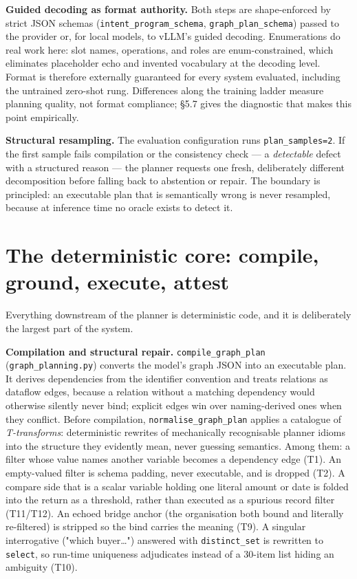 \textbf{Guided decoding as format authority.} Both steps are shape-enforced by strict JSON schemas (\texttt{intent\_program\_schema}, \texttt{graph\_plan\_schema}) passed to the provider or, for local models, to vLLM's guided decoding. Enumerations do real work here: slot names, operations, and roles are enum-constrained, which eliminates placeholder echo and invented vocabulary at the decoding level. Format is therefore externally guaranteed for every system evaluated, including the untrained zero-shot rung. Differences along the training ladder measure planning quality, not format compliance; §5.7 gives the diagnostic that makes this point empirically.

\textbf{Structural resampling.} The evaluation configuration runs \texttt{plan\_samples=2}. If the first sample fails compilation or the consistency check --- a \emph{detectable} defect with a structured reason --- the planner requests one fresh, deliberately different decomposition before falling back to abstention or repair. The boundary is principled: an executable plan that is semantically wrong is never resampled, because at inference time no oracle exists to detect it.

\section{The deterministic core: compile, ground, execute, attest}\label{sec:the-deterministic-core-compile-ground-ex}

Everything downstream of the planner is deterministic code, and it is deliberately the largest part of the system.

\textbf{Compilation and structural repair.} \texttt{compile\_graph\_plan} (\texttt{graph\_planning.py}) converts the model's graph JSON into an executable plan. It derives dependencies from the identifier convention and treats relations as dataflow edges, because a relation without a matching dependency would otherwise silently never bind; explicit edges win over naming-derived ones when they conflict. Before compilation, \texttt{normalise\_graph\_plan} applies a catalogue of \emph{T-transforms}: deterministic rewrites of mechanically recognisable planner idioms into the structure they evidently mean, never guessing semantics. Among them: a filter whose value names another variable becomes a dependency edge (T1). An empty-valued filter is schema padding, never executable, and is dropped (T2). A compare side that is a scalar variable holding one literal amount or date is folded into the return as a threshold, rather than executed as a spurious record filter (T11/T12). An echoed bridge anchor (the organisation both bound and literally re-filtered) is stripped so the bind carries the meaning (T9). A singular interrogative ("which buyer\ldots{}") answered with \texttt{distinct\_set} is rewritten to \texttt{select}, so run-time uniqueness adjudicates instead of a 30-item list hiding an ambiguity (T10).

